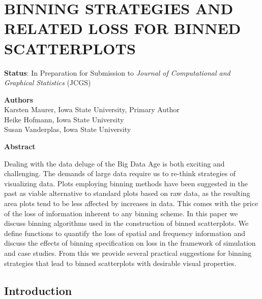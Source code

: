 \documentclass[11pt]{isuthesis}\usepackage[]{graphicx}\usepackage[]{color}
\begin{document}
\chapter{BINNING STRATEGIES AND RELATED LOSS FOR BINNED SCATTERPLOTS}
\label{BinnedScatter}


 
\begin{center}
\textbf{Status}: In Preparation for Submission to \textit{Journal of Computational and Graphical Statistics} (JCGS)\\
\end{center} 

\begin{center}
\textbf{Authors}\\
Karsten Maurer, Iowa State University, Primary Author\\
Heike Hofmann, Iowa State University\\
Susan Vanderplas, Iowa State University\\
\end{center}

\begin{center}
\textbf{Abstract}\\
\end{center}

Dealing with the data deluge of the Big Data Age is both exciting and challenging. The demands of large data require us to re-think strategies of visualizing data. Plots employing binning methods have been suggested in the past as viable alternative to standard plots based on raw data, as the resulting area plots tend to be less affected by increases in data. This comes with the price of the loss of information inherent to any binning scheme. In this paper we discuss binning algorithms used in the construction of binned scatterplots. We define functions to quantify the loss of spatial and frequency information and discuss the effects of binning specification on loss in the framework of simulation and case studies. From this we provide several practical suggestions for binning strategies that lead to binned scatterplots with desirable visual properties. 

\section{Introduction}
\label{Intro}
\end{document}
